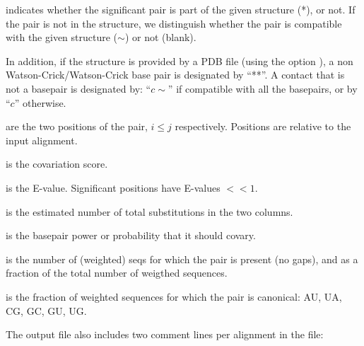 \begin{sreitems}{}
 \item[\prog{First column}] indicates whether the significant pair is
   part of the given structure (*), or not.  If the pair is not in the
   structure, we distinguish whether the pair is compatible with the
   given structure ($\sim$) or not (blank).

  In addition, if the structure is provided by a PDB file (using the
  option ), a non Watson-Crick/Watson-Crick base pair
  is designated by ``**''. A contact that is not a basepair is
  designated by: ``$c\sim$'' if compatible with all the basepairs, or
  by ``$c$'' otherwise.

 \item[\prog{Second and third columns}] are the two positions of the
   pair, $i\leq j$ respectively. Positions are relative to the input
   alignment.

 \item[\prog{Fourth column}] is the covariation score.

 \item[\prog{Fifth column}] is the E-value. Significant positions
   have E-values $<< 1$.

 \item[\prog{Sixth column}] is the estimated number of total substitutions in the two columns.
 
 \item[\prog{Seventh column}] is the basepair power or probability that it should covary.
 
 \item[\prog{Eight column}] is the number of (weighted) seqs for which the pair is present (no gaps), and as a fraction of the total number of weigthed sequences.
 
 \item[\prog{Nineth column}] is the fraction of weighted sequences for which the pair is canonical: AU, UA, CG, GC, GU, UG.
 
 \end{sreitems}
 The output file also includes two comment lines per alignment in the
 file:


